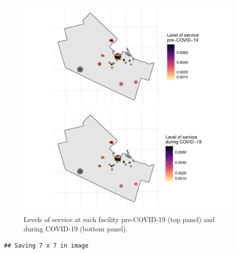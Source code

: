 \documentclass[]{elsarticle} %
\begin{document}
\begin{figure}
\includegraphics[width=1\linewidth]{Accessibility-Foodbanks-Hamilton_files/figure-latex/plot-levels-of-service-1} \caption{\label{fig:levels-of-service}Levels of service at each facility pre-COVID-19 (top panel) and during COVID-19 (bottom panel).}\label{fig:plot-levels-of-service}
\end{figure}

\begin{verbatim}
## Saving 7 x 7 in image
\end{verbatim}
\end{document}
